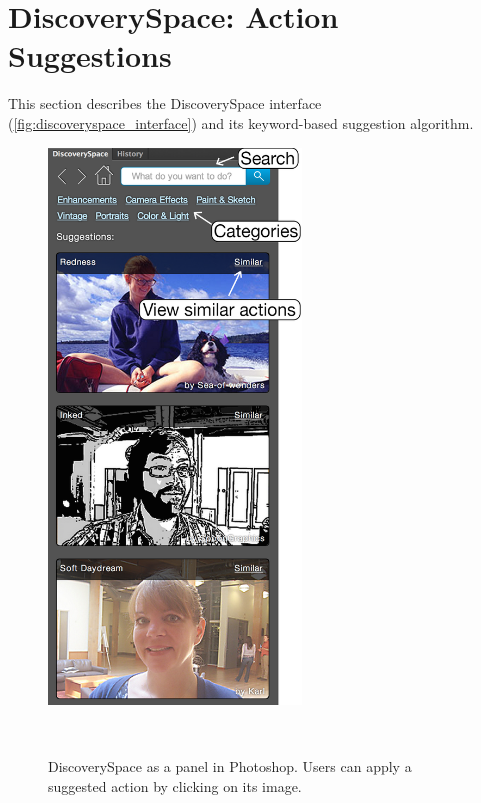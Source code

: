 \section{DiscoverySpace: Action Suggestions}
This section describes the Discovery\-Space interface (\autoref{fig:discoveryspace_interface}) and its keyword-based suggestion algorithm.

\begin{figure}
\centering
  \includegraphics[width=0.6\textwidth]{discoveryspace/figures/discoveryspace_with_labels.png}
  \caption{DiscoverySpace as a panel in Photoshop. Users can apply a suggested action by clicking on its image.}~\label{fig:discoveryspace_interface}
\end{figure}

